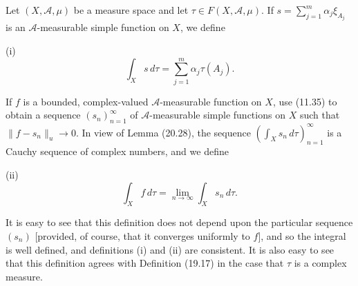Let $(X, \mathcal{A}, \mu)$ be a measure space and let $\tau \in F(X, \mathcal{A}, \mu)$. If $s = \sum_{j=1}^{m} \alpha_j \xi_{A_j}$ is an $\mathcal{A}$-measurable simple function on $X$, we define

(i) $$\int_X s \, d\tau = \sum_{j=1}^{m} \alpha_j \tau(A_j).$$

If $f$ is a bounded, complex-valued $\mathcal{A}$-measurable function on $X$, use (11.35) to obtain a sequence $(s_n)_{n=1}^{\infty}$ of $\mathcal{A}$-measurable simple functions on $X$ such that $\|f - s_n\|_u \to 0$. In view of Lemma (20.28), the sequence $(\int_X s_n \, d\tau)_{n=1}^{\infty}$ is a Cauchy sequence of complex numbers, and we define

(ii) $$\int_X f \, d\tau = \lim_{n \to \infty} \int_X s_n \, d\tau.$$

It is easy to see that this definition does not depend upon the particular sequence $(s_n)$ [provided, of course, that it converges uniformly to $f$], and so the integral is well defined, and definitions (i) and (ii) are consistent. It is also easy to see that this definition agrees with Definition (19.17) in the case that $\tau$ is a complex measure.